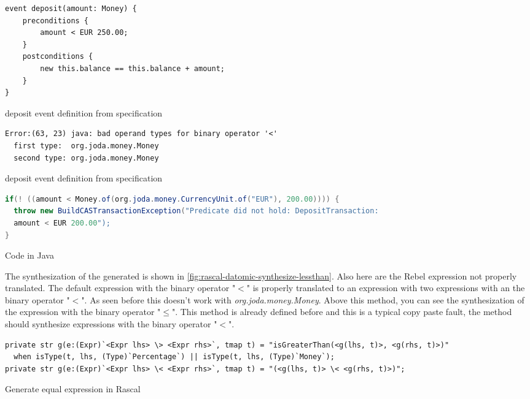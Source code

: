 
\begin{sourcecode}[h!]
\begin{lstlisting}[]
event deposit(amount: Money) {
	preconditions {
		amount < EUR 250.00;
	}
	postconditions {
		new this.balance == this.balance + amount;
	}
}
\end{lstlisting}
\caption{deposit event definition from specification}
\label{fig:java-deposit-maxamount}
\end{sourcecode}

\begin{sourcecode}[h!]
\begin{lstlisting}[]
Error:(63, 23) java: bad operand types for binary operator '<'
  first type:  org.joda.money.Money
  second type: org.joda.money.Money
\end{lstlisting}
\caption{deposit event definition from specification}
\label{fig:java-result-lessthan-compile-error}
\end{sourcecode}

\begin{sourcecode}[h!]
\begin{lstlisting}[language=Java]
if(! ((amount < Money.of(org.joda.money.CurrencyUnit.of("EUR"), 200.00)))) {
  throw new BuildCASTransactionException("Predicate did not hold: DepositTransaction:
  amount < EUR 200.00");
}
\end{lstlisting}
\caption{Code in Java}
\label{fig:java-lessthan-compile-error}
\end{sourcecode}

The synthesization of the generated is shown in
\autoref{fig:rascal-datomic-synthesize-lessthan}. Also here are the Rebel
expression not properly translated. The default expression with the binary
operator "$<$" is properly translated to an expression with two expressions with
 an the binary operator "$<$". As seen before this doesn't work with
 \textit{org.joda.money.Money}. Above this method, you can see the
 synthesization of the expression with the binary operator "$\leq$". This method
 is already defined before and this is a typical copy paste fault, the method
 should synthesize expressions with the binary operator "$<$".


\begin{sourcecode}[h!]
\begin{lstlisting}[]
private str g(e:(Expr)`<Expr lhs> \> <Expr rhs>`, tmap t) = "isGreaterThan(<g(lhs, t)>, <g(rhs, t)>)"
  when isType(t, lhs, (Type)`Percentage`) || isType(t, lhs, (Type)`Money`);
private str g(e:(Expr)`<Expr lhs> \< <Expr rhs>`, tmap t) = "(<g(lhs, t)> \< <g(rhs, t)>)";
\end{lstlisting}
\caption{Generate equal expression in Rascal}
\label{fig:rascal-datomic-synthesize-lessthan}
\end{sourcecode}


